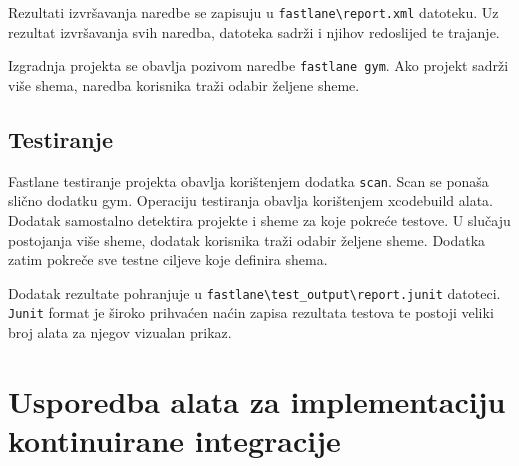 \documentclass[times, utf8, diplomski, numeric]{fer}
\begin{document}
\begin{appendices}
Rezultati izvršavanja naredbe se zapisuju u \verb|fastlane\report.xml| datoteku. Uz rezultat izvršavanja svih naredba, datoteka sadrži i njihov redoslijed te trajanje.

Izgradnja projekta se obavlja pozivom naredbe \verb|fastlane gym|. Ako projekt sadrži više shema, naredba korisnika traži odabir željene sheme.

\section{Testiranje}

Fastlane testiranje projekta obavlja korištenjem dodatka \verb|scan|\citep{fastlane:scan}. Scan se ponaša slično dodatku gym. Operaciju testiranja obavlja korištenjem xcodebuild alata. Dodatak samostalno detektira projekte i sheme za koje pokreće testove. U slučaju postojanja više sheme, dodatak korisnika traži odabir željene sheme. Dodatka zatim pokreče sve testne ciljeve koje definira shema.

Dodatak rezultate pohranjuje u \verb|fastlane\test_output\report.junit| datoteci. \verb|Junit| format je široko prihvaćen naćin zapisa rezultata testova te postoji veliki broj alata za njegov vizualan prikaz.

\chapter{Usporedba alata za implementaciju kontinuirane integracije} \label{header:dodatak_usporedba_alata_za_kontinuiranu_integraciju}

\end{appendices}
\end{document}

